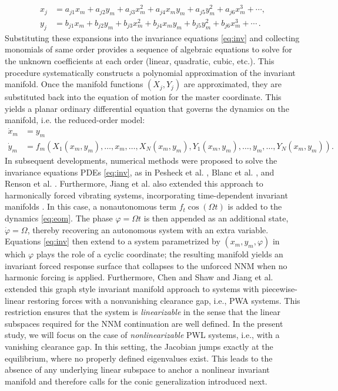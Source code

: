 \documentclass[a4paper,9pt,parskip=half,english]{article}
\theoremstyle{plain}
\theoremstyle{definition}
\begin{document}
\begin{equation}
	\begin{aligned}
	x_{j}&= a_{j1} x_m + a_{j2} y_m + a_{j3}x_{m}^{2}+a_{j4}x_{m}y_{m}+a_{j5}y_{m}^{2}+a_{j6}x_{m}^{3}+\cdots, \\ 
	y_{j}&=b_{j1} x_m + b_{j2} y_m + b_{j3}x_{m}^{2}+b_{j4}x_{m}y_{m}+b_{j5}y_{m}^{2}+b_{j6}x_{m}^{3}+\cdots \, .
	\end{aligned}\label{eq:polyexpansion}
\end{equation}
Substituting these expansions into the invariance equations \eqref{eq:inv} and collecting monomials of same order provides a sequence of algebraic equations to solve for the unknown coefficients at each order (linear, quadratic, cubic, etc.). This procedure systematically constructs a polynomial approximation of the invariant manifold. 
Once the manifold functions $(X_j,Y_j)$ are approximated, they are substituted back into the equation of motion for the master coordinate. This yields a planar ordinary differential equation that governs the dynamics on the manifold, i.e. the reduced-order model:
\begin{equation}
\begin{aligned}
\dot{x}_m &= y_m \\ 
\dot{y}_m &= f_m(X_1(x_m,y_m), \ldots, x_m, \ldots,X_N(x_m,y_m), Y_1(x_m,y_m), \ldots, y_m, \ldots,Y_N(x_m,y_m) ).
\end{aligned}
\end{equation}
In subsequent developments, numerical methods were proposed to solve the invariance equations PDEs \eqref{eq:inv}, as in Pesheck et al. \cite{Pesheck2001a, Pesheck2001, Pesheck2002}, Blanc et al. \cite{Blanc2013}, and Renson et al. \cite{Renson2014b}. Furthermore, Jiang et al. also extended this approach to harmonically forced vibrating systems, incorporating time-dependent invariant manifolds \cite{Jiang2005}. In this case, a nonautonomous term $f_t \cos(\Omega t)$ is added to the dynamics \eqref{eq:eom}. The phase $\varphi= \Omega t$ is then appended as an additional state, $\dot{\varphi}=\Omega$, thereby recovering an autonomous system with an extra variable. Equations \eqref{eq:inv} then extend to a system parametrized by $(x_m,y_m, \varphi)$ in which $\varphi$ plays the role of a cyclic coordinate; the resulting manifold yields an invariant forced response surface that collapses to the unforced NNM when no harmonic forcing is applied. Furthermore, Chen and Shaw \cite{Chen1996} and Jiang et al. \cite{Jiang2004} extended this graph style invariant manifold approach to systems with piecewise-linear restoring forces with a nonvanishing clearance gap, i.e., PWA systems. This restriction ensures that the system is \textit{linearizable} in the sense that the linear subspaces required for the NNM continuation are well defined. In the present study, we will focus on the case of \textit{nonlinearizable} PWL systems, i.e., with a vanishing clearance gap. In this setting, the Jacobian jumps exactly at the equilibrium, where no properly defined eigenvalues exist. This leads to the absence of any underlying linear subspace to anchor a nonlinear invariant manifold and therefore calls for the conic generalization introduced next. 
\end{document}
